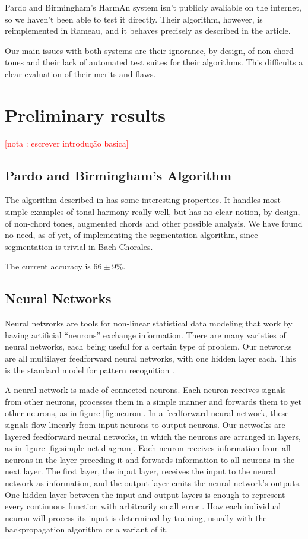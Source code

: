 \documentclass{article}
\newcounter{notacounter}
\newcommand{\nota}[1]{
  \addtocounter{notacounter}{1}
  \textcolor{red}{[nota \arabic{notacounter}: #1]}
}
\begin{document}
Pardo and Birmingham's HarmAn \cite{pardo99:automated} system isn't
publicly avaliable on the internet, so we haven't been able to test it
directly. Their algorithm, however, is reimplemented in Rameau, and it
behaves precisely as described in the article.

Our main issues with both systems are their ignorance, by design, of
non-chord tones and their lack of automated test suites for their
algorithms. This difficults a clear evaluation of their merits and
flaws.

\section{Preliminary results}
\label{sec:analysis-results}

\nota{escrever introdução basica}

\subsection{Pardo and Birmingham's Algorithm}
\label{sec:pardo-birmingham}

The algorithm described in \cite{pardo99:automated} has some
interesting properties. It handles most simple examples of tonal
harmony really well, but has no clear notion, by design, of non-chord
tones, augmented chords and other possible analysis. We
have found no need, as of yet, of implementing the segmentation
algorithm, since segmentation is trivial in Bach Chorales.

The current accuracy is $66 \pm 9\%$.


\subsection{Neural Networks}
\label{sec:neural-nets}

Neural networks are tools for non-linear statistical data
modeling that work by having artificial ``neurons'' exchange
information. There are many varieties of neural networks, each being
useful for a certain type of problem. Our networks are all multilayer
feedforward neural networks, with one hidden layer each. This is the
standard model for pattern recognition \cite{russell02:aima}.

A neural network is made of connected neurons. Each neuron receives
signals from other neurons, processes them in a simple manner and
forwards them to yet other neurons, as in figure \ref{fig:neuron}. In
a feedforward neural network, these signals flow linearly from input
neurons to output neurons. Our networks are layered feedforward neural
networks, in which the neurons are arranged in layers, as in figure
\ref{fig:simple-net-diagram}. Each neuron receives information from
all neurons in the layer preceding it and forwards information to all
neurons in the next layer. The first layer, the input layer, receives
the input to the neural network as information, and the output layer
emits the neural network's outputs. One hidden layer between the input
and output layers is enough to represent every continuous function
with arbitrarily small error \cite{russell02:aima}. How each
individual neuron will process its input is determined by training,
usually with the backpropagation algorithm or a variant of it.
\end{document}
